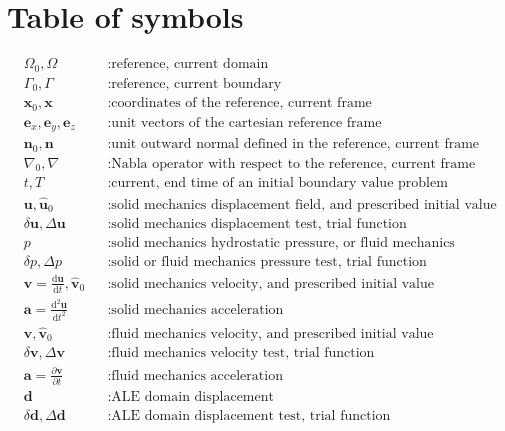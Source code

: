 \documentclass[a4paper,12pt]{report}
\newcommand{\bs}[1]{\boldsymbol{#1}}
\newcommand{\Om}{\mathit{\Omega}}
\newcommand{\Gm}{\mathit{\Gamma}}
\begin{document}
\clearpage

\section{Table of symbols}
\begin{equation}
\nonumber
\begin{aligned}
&\Om_0,\Om &&: \text{reference, current domain} \\
&\Gm_0,\Gm &&: \text{reference, current boundary} \\
&\bs{x}_0, \bs{x} &&: \text{coordinates of the reference, current frame} \\
&\bs{e}_x, \bs{e}_y, \bs{e}_z &&: \text{unit vectors of the cartesian reference frame} \\
&\bs{n}_0, \bs{n} &&: \text{unit outward normal defined in the reference, current frame} \\
&\nabla_{0},\nabla &&: \text{Nabla operator with respect to the reference, current frame} \\
&t, T &&: \text{current, end time of an initial boundary value problem} \\
&\bs{u}, \hat{\bs{u}}_{0} &&: \text{solid mechanics displacement field, and prescribed initial value} \\
&\delta\bs{u}, \Delta\bs{u} &&: \text{solid mechanics displacement test, trial function} \\
& p &&: \text{solid mechanics hydrostatic pressure, or fluid mechanics pressure} \\
& \delta p, \Delta p &&: \text{solid or fluid mechanics pressure test, trial function} \\
&\bs{v}=\frac{\mathrm{d}\bs{u}}{\mathrm{d}t}, \hat{\bs{v}}_{0} &&: \text{solid mechanics velocity, and prescribed initial value} \\
&\bs{a}=\frac{\mathrm{d}^2\bs{u}}{\mathrm{d}t^2} &&: \text{solid mechanics acceleration} \\
&\bs{v}, \hat{\bs{v}}_{0} &&: \text{fluid mechanics velocity, and prescribed initial value} \\
&\delta\bs{v}, \Delta\bs{v} &&: \text{fluid mechanics velocity test, trial function} \\
&\bs{a}=\frac{\partial\bs{v}}{\partial t} &&: \text{fluid mechanics acceleration} \\
&\bs{d} &&: \text{ALE domain displacement} \\
&\delta\bs{d}, \Delta\bs{d} &&: \text{ALE domain displacement test, trial function} \\

\end{aligned}
\end{equation}
\end{document}
